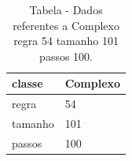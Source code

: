 \begin{table}[H]
\centering
\caption{Tabela - Dados referentes a Complexo regra 54 tamanho 101 passos 100.}
\label{tab:Complexo_regra_54_tamanho_101_passos_100}
\begin{tabular}{ll}
\toprule
classe & Complexo \\
\midrule
regra & 54 \\
tamanho & 101 \\
passos & 100 \\
\bottomrule
\end{tabular}

\end{table}
